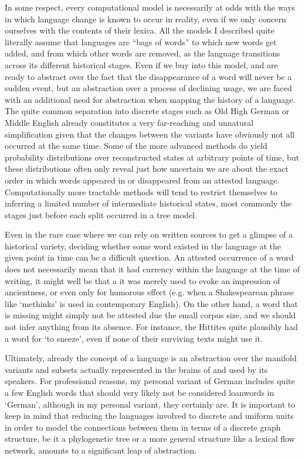 In some respect, every computational model is necessarily at odds with the ways in which language change is known to occur in reality, even if we only concern ourselves with the contents of their lexica. All the models I described quite literally assume that languages are ``bags of words'' to which new words get added, and from which other words are removed, as the language transitions across its different historical stages. Even if we buy into this model, and are ready to abstract over the fact that the disappearance of a word will never be a sudden event, but an abstraction over a process of declining usage, we are faced with an additional need for abstraction when mapping the history of a language. The quite common separation into discrete stages such as Old High German or Middle English already constitutes a very far-reaching and unnatural simplification given that the changes between the variants have obviously not all occurred at the same time. Some of the more advanced methods do yield probability distributions over reconstructed states at arbitrary points of time, but these distributions often only reveal just how uncertain we are about the exact order in which words appeared in or disappeared from an attested language. Computationally more tractable methods will tend to restrict themselves to inferring a limited number of intermediate historical states, most commonly the stages just before each split occurred in a tree model.

Even in the rare case where we can rely on written sources to get a glimpse of a historical variety, deciding whether some word existed in the language at the given point in time can be a difficult question. An attested occurrence of a word does not necessarily mean that it had currency within the language at the time of writing, it might well be that a it was merely used to evoke an impression of ancientness, or even only for humorous effect (e.g. when a Shakespearean phrase like `methinks' is used in contemporary English). On the other hand, a word that is missing might simply not be attested due the small corpus size, and we should not infer anything from its absence. For instance, the Hittites quite plausibly had a word for `to sneeze', even if none of their surviving texts might use it. 

Ultimately, already the concept of a language is an abstraction over the manifold variants and subsets actually represented in the brains of and used by its speakers. For professional reasons, my personal variant of German includes quite a few English words that should very likely not be considered loanwords in `German', although in my personal variant, they certainly are. It is important to keep in mind that reducing the languages involved to discrete and uniform units in order to model the connections between them in terms of a discrete graph structure, be it a phylogenetic tree or a more general structure like a lexical flow network, amounts to a significant leap of abstraction. 

